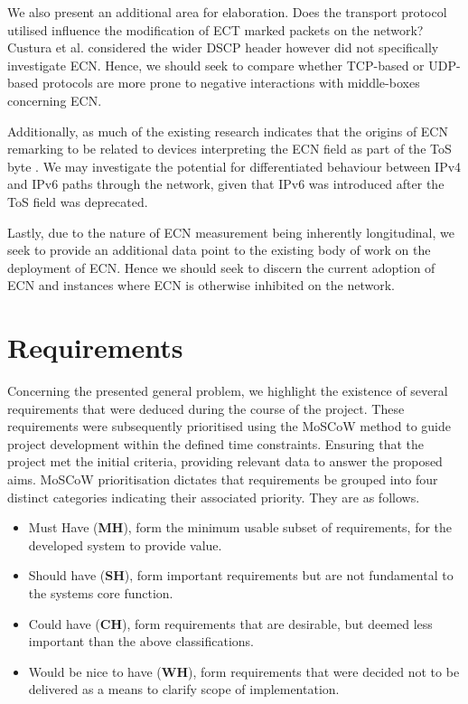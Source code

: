 \documentclass{l4proj}
\begin{document}
We also present an additional area for elaboration. Does the transport protocol utilised influence the modification of ECT marked packets on the network? Custura et al.\cite{custura_exploring_2018} considered the wider DSCP header however did not specifically investigate ECN. Hence, we should seek to compare whether TCP-based or UDP-based protocols are more prone to negative interactions with middle-boxes concerning ECN.

Additionally, as much of the existing research indicates that the origins of ECN remarking to be related to devices interpreting the ECN field as part of the ToS byte \cite{custura_exploring_2018}\cite{bauer_measuring_2011}. We may investigate the potential for differentiated behaviour between IPv4 and IPv6 paths through the network, given that IPv6 was introduced after the ToS field was deprecated.

Lastly, due to the nature of ECN measurement being inherently longitudinal, we seek to provide an additional data point to the existing body of work on the deployment of ECN. Hence we should seek to discern the current adoption of ECN and instances where ECN is otherwise inhibited on the network.


\section{Requirements}
\label{sec:requirements}

Concerning the presented general problem, we highlight the existence of several requirements that were deduced during the course of the project. These requirements were subsequently prioritised using the MoSCoW method to guide project development within the defined time constraints. Ensuring that the project met the initial criteria, providing relevant data to answer the proposed aims. MoSCoW prioritisation dictates that requirements be grouped into four distinct categories indicating their associated priority. They are as follows.

\begin{itemize}
    \item Must Have (\textbf{MH}), form the minimum usable subset of requirements, for the developed system to provide value.
    \item Should have (\textbf{SH}), form important requirements but are not fundamental to the systems core function.
    \item Could have (\textbf{CH}), form requirements that are desirable, but deemed less important than the above classifications.
    \item Would be nice to have (\textbf{WH}), form requirements that were decided not to be delivered as a means to clarify scope of implementation.
\end{itemize}
\end{document}
